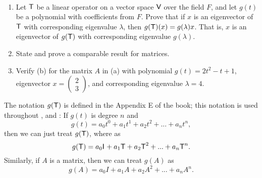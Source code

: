 \begin{exercise} \label{exercise 5.1.22} \ 

\begin{enumerate}
\item Let \(\textsf{T}\) be a linear operator on a vector space \(\textsf{V}\) over the field \(F\), and let \(g(t)\) be a polynomial with coefficients from \(F\).
Prove that if \(x\) is an eigenvector of \(\textsf{T}\) with corresponding eigenvalue \(\lambda\), then \(g(\textsf{T})(x) = g(\lambda)x\).
That is, \(x\) is an eigenvector of \(g(\textsf{T})\) with corresponding eigenvalue \(g(\lambda)\).
\item State and prove a comparable result for matrices.
\item Verify (b) for the matrix \(A\) in (a) with polynomial \(g(t) = 2t^2 - t + 1\), eigenvector \(x = \begin{pmatrix} 2 \\ 3 \end{pmatrix}\), and corresponding eigenvalue \(\lambda = 4\).
\end{enumerate}
\end{exercise}

\begin{note}
The notation \(g(\textsf{T})\) is defined in the Appendix E of the book;
this notation is used throughout ,  and :
If \(g(t)\) is degree \(n\) and
\[
    g(t) = a_0 t^0 + a_1 t^1 + a_2 t^2 + ... + a_n t^n,
\]
then we can just treat \(g(\textsf{T})\), where as
\[
    g(\textsf{T}) = a_0 \textsf{I}_{_{}} + a_1 \textsf{T} + a_2 \textsf{T}^2 + ... + a_n \textsf{T}^n.
\]
Similarly, if \(A\) is a matrix, then we can treat \(g(A)\) as
\[
    g(A) = a_0 I + a_1 A + a_2 A^2 + ... + a_n A^n.
\]
\end{note}

